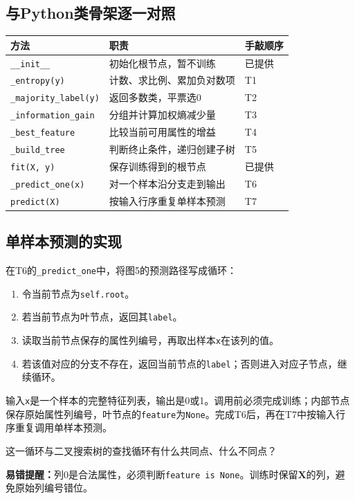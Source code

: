 \documentclass[UTF8,a4paper,11pt,fontset=fandol]{ctexart}
\numberwithin{equation}{subsection}
\begin{document}
\clearpage
\subsection{与Python类骨架逐一对照}
\par\noindent\begin{tabularx}{\textwidth}{L{4.3cm}Y L{2cm}}
\toprule
方法 & 职责 & 手敲顺序\\
\midrule
\texttt{\_\_init\_\_} & 初始化根节点，暂不训练 & 已提供\\
\texttt{\_entropy(y)} & 计数、求比例、累加负对数项 & T1\\
\texttt{\_majority\_label(y)} & 返回多数类，平票选0 & T2\\
\texttt{\_information\_gain} & 分组并计算加权熵减少量 & T3\\
\texttt{\_best\_feature} & 比较当前可用属性的增益 & T4\\
\texttt{\_build\_tree} & 判断终止条件，递归创建子树 & T5\\
\texttt{fit(X, y)} & 保存训练得到的根节点 & 已提供\\
\texttt{\_predict\_one(x)} & 对一个样本沿分支走到输出 & T6\\
\texttt{predict(X)} & 按输入行序重复单样本预测 & T7\\
\bottomrule
\end{tabularx}\par

\subsection{单样本预测的实现}
在T6的\texttt{\_predict\_one}中，将图5的预测路径写成循环：
\begin{enumerate}
\item 令当前节点为\texttt{self.root}。
\item 若当前节点为叶节点，返回其\texttt{label}。
\item 读取当前节点保存的属性列编号，再取出样本\texttt{x}在该列的值。
\item 若该值对应的分支不存在，返回当前节点的\texttt{label}；否则进入对应子节点，继续循环。
\end{enumerate}
输入\texttt{x}是一个样本的完整特征列表，输出是0或1。调用前必须完成训练；内部节点保存原始属性列编号，叶节点的\texttt{feature}为\texttt{None}。完成T6后，再在T7中按输入行序重复调用单样本预测。

\begin{questionbox}[思考题7]
这一循环与二叉搜索树的查找循环有什么共同点、什么不同点？
\end{questionbox}
\textbf{易错提醒：}列0是合法属性，必须判断\texttt{feature is None}。训练时保留$\mathbf X$的列，避免原始列编号错位。
\end{document}
